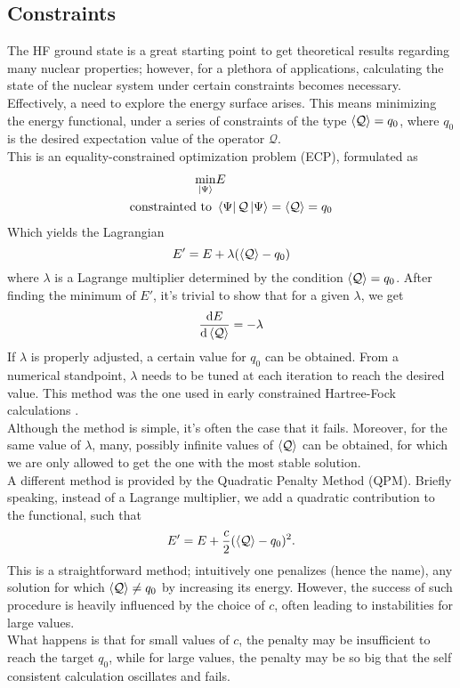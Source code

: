 \subsection{Constraints}
The HF ground state is a great starting point to get theoretical results regarding many nuclear properties; however, for a plethora of applications, calculating the state of the nuclear system under certain constraints becomes necessary.
\\Effectively, a need to explore the energy surface arises. This means minimizing the energy functional, under a series of constraints of the type $\expval{ {\mathcal Q}}=q_0$, where $q_0$ is the desired expectation value of the operator ${\mathcal Q}$.
\\This is an equality-constrained optimization problem (ECP), formulated as
\begin{align}
\min_{\ket \Psi}&E 
\\\text{constrainted to } &\bra{\Psi} {\mathcal Q} \ket {\Psi} = \expval{ {\mathcal Q}} = q_0
\end{align}
Which yields the Lagrangian
\begin{equation}
    \label{eq:constr_lagrangian}
    E' = E + \lambda (\expval{{\mathcal Q}}-q_0)
\end{equation}
where $\lambda$ is a Lagrange multiplier determined by the condition $\expval {{\mathcal Q}} = q_0$. 
After finding the minimum of $E'$, it's trivial to show that for a given $\lambda$, we get \cite{FLOCARD1973433}
\begin{equation}
\dv{E}{\expval{{\mathcal Q}}} = -\lambda 
\end{equation}
If $\lambda$ is properly adjusted, a certain value for $q_0$ can be obtained. From a numerical standpoint, $\lambda$ needs to be tuned at each iteration to reach the desired value. 
This method was the one used in early constrained Hartree-Fock calculations \cite{Cusson1985}.
\\Although the method is simple, it's often the case that it fails. Moreover, for the same value of $\lambda$, many, possibly infinite values of $\expval{{\mathcal Q}}$ can be obtained, for which we are only allowed to get the one with the most stable solution.
\\A different method is provided by the Quadratic Penalty Method (QPM). Briefly speaking, instead of a Lagrange multiplier, we add a quadratic contribution to the functional, such that
\begin{equation}
    \label{eq:constr_quadratic}
    E' = E + \frac c 2 (\expval{{\mathcal Q}}-q_0)^2.
\end{equation}
This is a straightforward method; intuitively one penalizes (hence the name), any solution for which $\expval{{\mathcal Q}}\neq q_0$ by increasing its energy. However, the success of such procedure is heavily influenced by the choice of $c$, often leading to instabilities for large values.
\\What happens is that for small values of $c$, the penalty may be insufficient to reach the target $q_0$, while for large values, the penalty may be so big that the self consistent calculation oscillates and fails.
